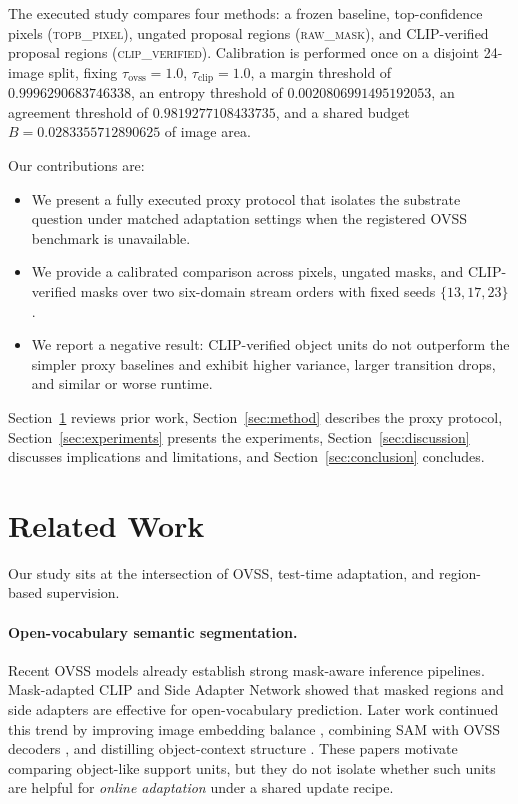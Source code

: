\documentclass{article}
\newcommand{\method}{\textsc{clip\_verified}}
\newcommand{\topb}{\textsc{topb\_pixel}}
\newcommand{\rawmask}{\textsc{raw\_mask}}
\begin{document}
The executed study compares four methods: a frozen baseline, top-confidence pixels (\topb{}), ungated proposal regions (\rawmask{}), and CLIP-verified proposal regions (\method{}). Calibration is performed once on a disjoint 24-image split, fixing $\tau_{\text{ovss}}=1.0$, $\tau_{\text{clip}}=1.0$, a margin threshold of $0.9996290683746338$, an entropy threshold of $0.0020806991495192053$, an agreement threshold of $0.9819277108433735$, and a shared budget $B=0.0283355712890625$ of image area.

Our contributions are:
\begin{itemize}[leftmargin=*,topsep=2pt,itemsep=2pt]
  \item We present a fully executed proxy protocol that isolates the substrate question under matched adaptation settings when the registered OVSS benchmark is unavailable.
  \item We provide a calibrated comparison across pixels, ungated masks, and CLIP-verified masks over two six-domain stream orders with fixed seeds $\{13,17,23\}$.
  \item We report a negative result: CLIP-verified object units do not outperform the simpler proxy baselines and exhibit higher variance, larger transition drops, and similar or worse runtime.
\end{itemize}

Section~\ref{sec:related} reviews prior work, Section~\ref{sec:method} describes the proxy protocol, Section~\ref{sec:experiments} presents the experiments, Section~\ref{sec:discussion} discusses implications and limitations, and Section~\ref{sec:conclusion} concludes.

\section{Related Work}
\label{sec:related}
Our study sits at the intersection of OVSS, test-time adaptation, and region-based supervision.

\paragraph{Open-vocabulary semantic segmentation.}
Recent OVSS models already establish strong mask-aware inference pipelines. Mask-adapted CLIP \citep{liang2023ovseg} and Side Adapter Network \citep{xu2023san} showed that masked regions and side adapters are effective for open-vocabulary prediction. Later work continued this trend by improving image embedding balance \citep{shan2024ebseg}, combining SAM with OVSS decoders \citep{lee2024escnet,chen2025sammi}, and distilling object-context structure \citep{kim2024dsg}. These papers motivate comparing object-like support units, but they do not isolate whether such units are helpful for \emph{online adaptation} under a shared update recipe.
\end{document}
